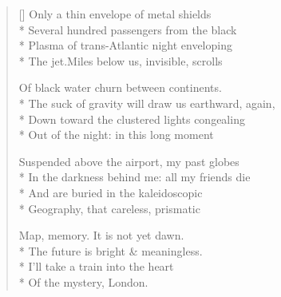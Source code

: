\label{ch:flight}
\settowidth{\versewidth}{The suck of gravity will draw us earthward, again,}
\begin{verse}[\versewidth]
Only a thin envelope of metal shields\\*
Several hundred passengers from the black\\*
Plasma of trans-Atlantic night enveloping\\*
The jet.\quad Miles below us, invisible, scrolls

Of black water churn between continents.\\*
The suck of gravity will draw us earthward, again,\\*
Down toward the clustered lights congealing\\*
Out of the night: in this long moment

Suspended above the airport, my past globes\\*
In the darkness behind me: all my friends die\\*
And are buried in the kaleidoscopic\\*
Geography, that careless, prismatic

Map, memory. \hspace*{1\vgap} It is not yet dawn.\\*
The future is bright \& meaningless.\\*
I'll take a train into the heart\\*
\hspace*{1\vgap} Of the mystery, London.
\end{verse}
